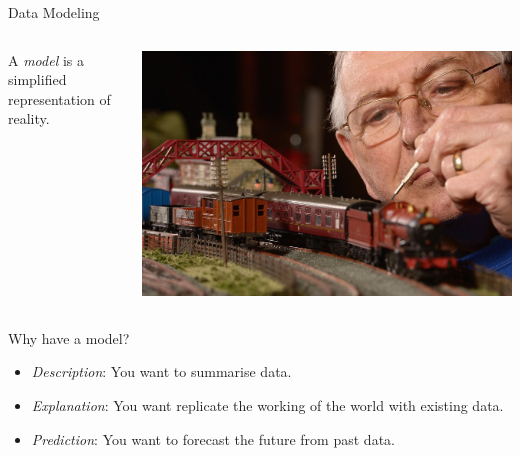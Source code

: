 \documentclass{beamer}
\begin{document}
\begin{frame}{Data Modeling}
    \begin{columns}
        \begin{column}{0.5\textwidth}
            A \textit{model} is a simplified representation of reality. \\

            \vspace*{1em}

        \end{column}
        \begin{column}{0.5\textwidth}
            \includegraphics[width=\textwidth]{img/model-train.jpg}
        \end{column}
    \end{columns}
\end{frame}

\begin{frame}{Why have a model?}
    \begin{itemize}[<+->]
        \item \textit{Description}: You want to summarise data.
        \item \textit{Explanation}: You want replicate the working of the world with existing data.
        \item \textit{Prediction}: You want to forecast the future from past data.
    \end{itemize}
    
    \vspace*{1em}

    \vspace*{1em}
\end{frame}
\end{document}
